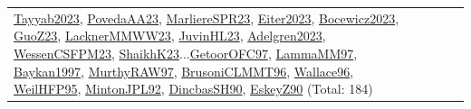 {\begin{longtable}{p{3cm}r>{\raggedright\arraybackslash}p{6cm}>{\raggedright\arraybackslash}p{6cm}>{\raggedright\arraybackslash}p{8cm}}
\hyperref[detail:Tayyab2023]{Tayyab2023}, \hyperref[detail:PovedaAA23]{PovedaAA23}, \hyperref[detail:MarliereSPR23]{MarliereSPR23}, \hyperref[detail:Eiter2023]{Eiter2023}, \hyperref[detail:Bocewicz2023]{Bocewicz2023}, \hyperref[detail:GuoZ23]{GuoZ23}, \hyperref[detail:LacknerMMWW23]{LacknerMMWW23}, \hyperref[detail:JuvinHL23]{JuvinHL23}, \hyperref[detail:Adelgren2023]{Adelgren2023}, \hyperref[detail:WessenCSFPM23]{WessenCSFPM23}, \hyperref[detail:ShaikhK23]{ShaikhK23}...\hyperref[detail:GetoorOFC97]{GetoorOFC97}, \hyperref[detail:LammaMM97]{LammaMM97}, \hyperref[detail:Baykan1997]{Baykan1997}, \hyperref[detail:MurthyRAW97]{MurthyRAW97}, \hyperref[detail:BrusoniCLMMT96]{BrusoniCLMMT96}, \hyperref[detail:Wallace96]{Wallace96}, \hyperref[detail:WeilHFP95]{WeilHFP95}, \hyperref[detail:MintonJPL92]{MintonJPL92}, \hyperref[detail:DincbasSH90]{DincbasSH90}, \hyperref[detail:EskeyZ90]{EskeyZ90} (Total: 184)\\

\end{longtable}}
